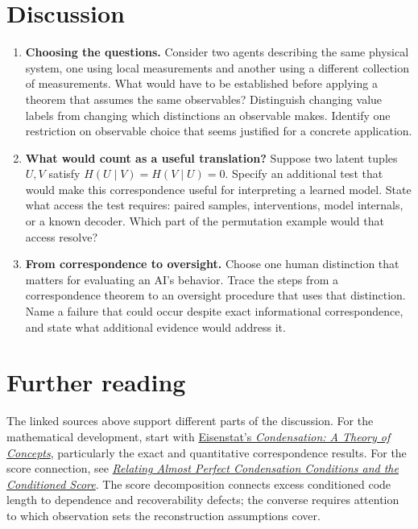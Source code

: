 \documentclass[10pt]{article}
\begin{document}
\section{Discussion}
\begin{enumerate}
\item \textbf{Choosing the questions.} Consider two agents describing the same
physical system, one using local measurements and another using a different
collection of measurements. What would have to be established before applying
a theorem that assumes the same observables? Distinguish changing value labels
from changing which distinctions an observable makes. Identify one restriction
on observable choice that seems justified for a concrete application.
\item \textbf{What would count as a useful translation?} Suppose two latent tuples $U,V$
satisfy $H(U\mid V)=H(V\mid U)=0$. Specify an additional test
that would make this correspondence useful for interpreting a learned model.
State what access the test requires: paired samples, interventions, model
internals, or a known decoder. Which part of the permutation example would
that access resolve?
\item \textbf{From correspondence to oversight.} Choose one human distinction
that matters for evaluating an AI's behavior. Trace the steps from a
correspondence theorem to an oversight procedure that uses that distinction.
Name a failure that could occur despite exact informational correspondence,
and state what additional evidence would address it.
\end{enumerate}

\section{Further reading}
The linked sources above support different parts
of the discussion. For the mathematical development, start with
\href{https://openreview.net/pdf?id=HwKFJ3odui}{Eisenstat's \emph{Condensation: A Theory of Concepts}},
particularly the exact and quantitative correspondence results.
For the score connection, see
\href{https://satyabenson.com/writing/condensation-conditions-conditioned-score}{\emph{Relating Almost Perfect Condensation Conditions and the Conditioned Score}}.
The score decomposition connects excess conditioned code length to dependence
and recoverability defects; the converse requires attention to which observation
sets the reconstruction assumptions cover.
\end{document}
